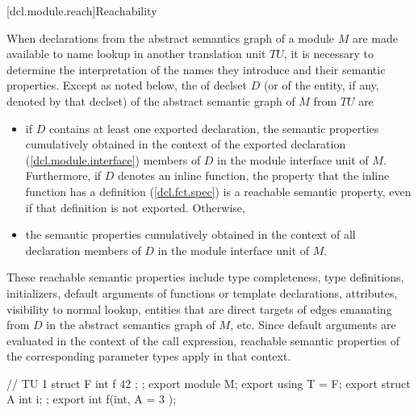 [dcl.module.reach]{Reachability}

\begin{std.txt}\color{addclr}
  \resetalinea[0]
  \alinea
  When declarations from the abstract semantics graph of a module $M$
   are made available 
  to name lookup in another translation unit $TU$, it is necessary to
  determine the interpretation of the names they introduce and their
  semantic properties. Except as noted below, the 
   of declset $D$
  (or of the entity, if any, denoted by that declset)
  of the abstract semantic graph of $M$ from $TU$ are 
  \begin{itemize}
    \item if $D$ contains at least one exported declaration, 
    the semantic properties cumulatively obtained in the context
    of the exported declaration (\ref{dcl.module.interface}) 
    members of $D$ in the module interface
    unit of $M$. Furthermore, if $D$ denotes an inline function,
    the property that the inline function has a definition
    (\ref{dcl.fct.spec}) is a reachable semantic property, even 
    if that definition is not exported. Otherwise,
    \item the semantic properties cumulatively obtained in the context of all
    declaration members of $D$ in the module interface unit of $M$.
  \end{itemize}
  \enternote
  These reachable semantic properties include type completeness, 
  type definitions, initializers,
  default arguments of functions or template declarations, attributes,
  visibility to normal lookup, entities that are direct targets of edges 
  emanating from $D$ in the abstract semantics graph of $M$, etc.
  Since default arguments are evaluated in the context of the call expression,
  reachable semantic properties of the corresponding parameter types apply in 
  that context. 
  \begin{example}
    \begin{codeblock}
      // TU 1
      struct F { int f { 42 }; };
      export module M;
      export using T = F;
      export struct A { int i; };
      export int f(int, A = { 3 });


\end{codeblock}
\end{example}
\end{std.txt}
